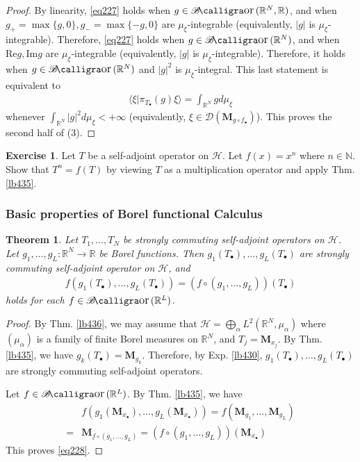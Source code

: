 \documentclass[12pt,b5paper,notitlepage]{article}
\theoremstyle{definition}
\newtheorem{exe}[df]{Exercise}
\theoremstyle{plain}
\newtheorem{thm}[df]{Theorem}
\DeclareMathOperator{\Bor}{\mathscr{B}\text{\kern -2pt {\calligra\large or}}\,}
\newcommand{\Dom}{\mathscr{D}}
\newcommand{\bk}[1]{\langle {#1}\rangle}
\newcommand{\blt}{\bullet}
\newcommand{\Nbb}{\mathbb N}
\newcommand{\Rbb}{\mathbb R}
\newcommand{\Real}{\mathrm{Re}}
\newcommand{\Imag}{\mathrm{Im}}
\newcommand{\MH}{\mathcal H}
\newcommand{\Mbf}{\mathbf M}
\numberwithin{equation}{section}
\begin{document}
\begin{proof}
By linearity, \eqref{eq227} holds when $g\in\Bor(\Rbb^N,\Rbb)$, and when $g_+=\max\{g,0\},g_-=\max\{-g,0\}$ are $\mu_\xi$-integrable (equivalently, $|g|$ is $\mu_\xi$-integrable). Therefore, \eqref{eq227} holds when $g\in\Bor(\Rbb^N)$, and when $\Real g,\Imag g$ are $\mu_\xi$-integrable (equivalently, $|g|$ is $\mu_\xi$-integrable). Therefore, it holds when $g\in\Bor(\Rbb^N)$ and $|g|^2$ is $\mu_\xi$-integral. This last statement is equivalent to
\begin{align*}
\bk{\xi|\pi_{T_\blt}(g)\xi}=\int_{\Rbb^N}gd\mu_\xi
\end{align*}
whenever $\int_{\Rbb^N}|g|^2d\mu_\xi<+\infty$ (equivalently, $\xi\in\Dom(\Mbf_{g\circ f_\blt})$). This proves the second half of (3).
\end{proof}


\begin{exe}\label{lb445}
Let $T$ be a self-adjoint operator on $\MH$. Let $f(x)=x^n$ where $n\in\Nbb$. Show that $T^n=f(T)$ by viewing $T$ as a multiplication operator and apply Thm. \ref{lb435}.
\end{exe}



\subsubsection{Basic properties of Borel functional Calculus}



\begin{thm}\label{lb437}
Let $T_1,\dots,T_N$ be strongly commuting self-adjoint operators on $\MH$. Let $g_1,\dots,g_L:\Rbb^N\rightarrow\Rbb$ be Borel functions. Then $g_1(T_\blt),\dots,g_L(T_\blt)$ are strongly commuting self-adjoint operator on $\MH$, and
\begin{align}\label{eq228}
f(g_1(T_\blt),\dots,g_L(T_\blt))=(f\circ(g_1,\dots,g_L))(T_\blt)
\end{align}
holds for each $f\in\Bor(\Rbb^L)$.
\end{thm}


\begin{proof}
By Thm. \ref{lb436}, we may assume that $\MH=\bigoplus_\alpha L^2(\Rbb^N,\mu_\alpha)$ where $(\mu_\alpha)$ is a family of finite Borel measures on $\Rbb^N$, and $T_j=\Mbf_{x_j}$. By Thm. \ref{lb435}, we have $g_k(T_\blt)=\Mbf_{g_k}$. Therefore, by Exp. \ref{lb430}, $g_1(T_\blt),\dots,g_L(T_\blt)$ are strongly commuting self-adjoint operators.

Let $f\in\Bor(\Rbb^L)$. By Thm. \ref{lb435}, we have
\begin{align*}
&f(g_1(\Mbf_{x_\blt}),\dots,g_L(\Mbf_{x_\blt}))=f(\Mbf_{g_1},\dots,\Mbf_{g_L})\\
=&\Mbf_{f\circ(g_1,\dots,g_L)}=(f\circ(g_1,\dots,g_L))(\Mbf_{x_\blt})
\end{align*}
This proves \eqref{eq228}.
\end{proof}
\end{document}
